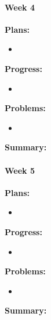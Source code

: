 \paragraph{Week 4}
\begin{adjustwidth}{2.5em}{0pt}
    \vspace{-0.5cm}\textbf{Plans:}
    \vspace{-0.5cm}
    \begin{itemize}
        \item 
    \end{itemize} 
    \vspace{-0.3cm}\textbf{Progress:}
    \vspace{-0.5cm}
    \begin{itemize}
        \item  
    \end{itemize} 
    \vspace{-0.3cm}\textbf{Problems:}
    \vspace{-0.5cm}
    \begin{itemize}
        \item  
    \end{itemize}  
    \vspace{-0.3cm}\noindent\textbf{Summary:}\\
    \noindent 
\end{adjustwidth} 

\paragraph{Week 5}
\begin{adjustwidth}{2.5em}{0pt}
    \vspace{-0.5cm}\textbf{Plans:}
    \vspace{-0.5cm}
    \begin{itemize}
        \item 
    \end{itemize} 
    \vspace{-0.3cm}\textbf{Progress:}
    \vspace{-0.5cm}
    \begin{itemize}
        \item 
    \end{itemize} 
    \vspace{-0.3cm}\textbf{Problems:}
    \vspace{-0.5cm}
    \begin{itemize}
        \item 
    \end{itemize}  
    \vspace{-0.3cm}\noindent\textbf{Summary:}\\
    \noindent 
\end{adjustwidth} 

